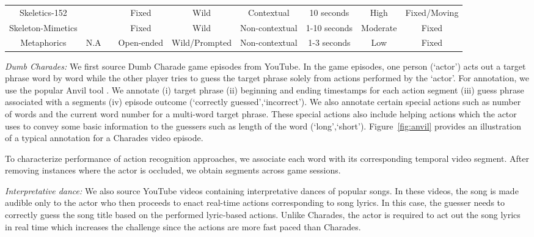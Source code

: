 \documentclass[twocolumn]{svjour3}          \smartqed  \usepackage{graphicx}
\begin{document}
\begin{table*}[!ht]
{\begin{tabular}{c|cccccccc}
        \rowcolor{Gray}
        Skeletics-152 &   &  & Fixed & Wild & Contextual & 10 seconds & High & Fixed/Moving \\

        \rowcolor{Gray}
        Skeleton-Mimetics &  &  & Fixed & Wild & Non-contextual & 1-10 seconds & Moderate & Fixed \\
        
        \rowcolor{Gray}
        Metaphorics & N.A &  & Open-ended & Wild/Prompted & Non-contextual & 1-3 seconds & Low & Fixed \\
        
         \bottomrule
    \end{tabular}
    }
\label{tab:datasets}
\end{table*}



\noindent \textit{Dumb Charades:} We first source Dumb Charade game episodes from YouTube. In the game episodes, one person (`actor') acts out a target phrase word by word while the other player tries to guess the target phrase solely from actions performed by the `actor'. For annotation, we use the popular Anvil tool \cite{kipp2001anvil}.  We annotate (i) target phrase (ii) beginning and ending timestamps for each action segment (iii) guess phrase associated with a segments (iv) episode outcome (`correctly guessed',`incorrect'). We also annotate certain special actions such as number of words and the current word number for a multi-word target phrase. These special actions also include helping actions which the actor uses to convey some basic information to the guessers such as length of the word (`long',`short'). Figure~\ref{fig:anvil} provides an illustration of a typical annotation for a Charades video episode.

To characterize performance of action recognition approaches, we associate each word with its corresponding temporal video segment. After removing instances where the actor is occluded, we obtain  segments across  game sessions.

\noindent \textit{Interpretative dance:} We also source YouTube videos containing interpretative dances of popular songs. In these videos, the song is made audible only to the actor who then proceeds to enact real-time actions corresponding to song lyrics. In this case, the guesser needs to correctly guess the song title based on the performed lyric-based actions. Unlike Charades, the actor is required to act out the song lyrics in real time which increases the challenge since the actions are more fast paced than Charades. 
\end{document}
